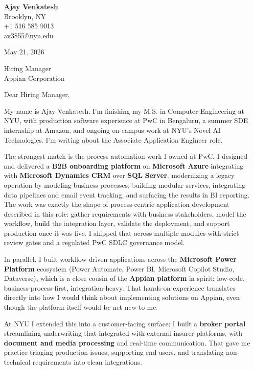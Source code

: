 \documentclass[letterpaper,11pt]{article}
\begin{document}
\begin{flushleft}
\textbf{\large Ajay Venkatesh} \\
Brooklyn, NY \\
+1 516 585 9013 \\
\href{mailto:av3855@nyu.edu}{av3855@nyu.edu}
\end{flushleft}
\vspace{10pt}
May 21, 2026
\vspace{6pt}

Hiring Manager \\
Appian Corporation

\vspace{10pt}

Dear Hiring Manager,

My name is Ajay Venkatesh. I'm finishing my M.S. in Computer Engineering at NYU, with production software experience at PwC in Bengaluru, a summer SDE internship at Amazon, and ongoing on-campus work at NYU's Novel AI Technologies. I'm writing about the Associate Application Engineer role.

The strongest match is the process-automation work I owned at PwC. I designed and delivered a \textbf{B2B onboarding platform} on \textbf{Microsoft Azure} integrating with \textbf{Microsoft Dynamics CRM} over \textbf{SQL Server}, modernizing a legacy operation by modeling business processes, building modular services, integrating data pipelines and email event tracking, and surfacing the results in BI reporting. The work was exactly the shape of process-centric application development described in this role: gather requirements with business stakeholders, model the workflow, build the integration layer, validate the deployment, and support production once it was live. I shipped that across multiple modules with strict review gates and a regulated PwC SDLC governance model.

In parallel, I built workflow-driven applications across the \textbf{Microsoft Power Platform} ecosystem (Power Automate, Power BI, Microsoft Copilot Studio, Dataverse), which is a close cousin of the \textbf{Appian platform} in spirit: low-code, business-process-first, integration-heavy. That hands-on experience translates directly into how I would think about implementing solutions on Appian, even though the platform itself would be net new to me.

At NYU I extended this into a customer-facing surface: I built a \textbf{broker portal} streamlining underwriting that integrated with external insurer platforms, with \textbf{document and media processing} and real-time communication. That gave me practice triaging production issues, supporting end users, and translating non-technical requirements into clean integrations.
\end{document}
